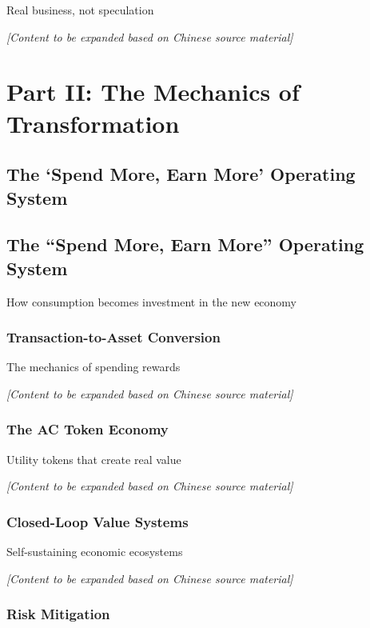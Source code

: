\documentclass[
  Letterpaper,
]{scrbook}
\begin{document}
Real business, not speculation

\emph{{[}Content to be expanded based on Chinese source material{]}}

\part{Part II: The Mechanics of Transformation}

\chapter{The `Spend More, Earn More' Operating
System}\label{the-spend-more-earn-more-operating-system}

\chapter{The ``Spend More, Earn More'' Operating
System}\label{sec-spend-earn-system}

How consumption becomes investment in the new economy

\section{Transaction-to-Asset
Conversion}\label{transaction-to-asset-conversion}

The mechanics of spending rewards

\emph{{[}Content to be expanded based on Chinese source material{]}}

\section{The AC Token Economy}\label{the-ac-token-economy}

Utility tokens that create real value

\emph{{[}Content to be expanded based on Chinese source material{]}}

\section{Closed-Loop Value Systems}\label{closed-loop-value-systems}

Self-sustaining economic ecosystems

\emph{{[}Content to be expanded based on Chinese source material{]}}

\section{Risk Mitigation}\label{risk-mitigation}
\end{document}
